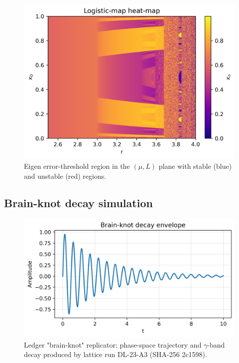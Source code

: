\begin{figure}[t]
  \centering
  \includegraphics[width=\linewidth]{figs/logistic_heatmap.png}
  \caption{Eigen error-threshold region in the $(\mu,L)$ plane with stable (blue) and unstable (red) regions.}
  \label{fig:heatmap}
\end{figure}

\subsection{Brain-knot decay simulation}

\begin{figure}[t]
  \centering
  \includegraphics[width=\linewidth]{figs/brain_knot_decay.png}
  \caption{Ledger "brain-knot" replicator: phase-space trajectory and
           $\gamma$-band decay produced by lattice run DL-23-A3 (SHA-256 2c1598).}
  \label{fig:brain-knot}
\end{figure}


